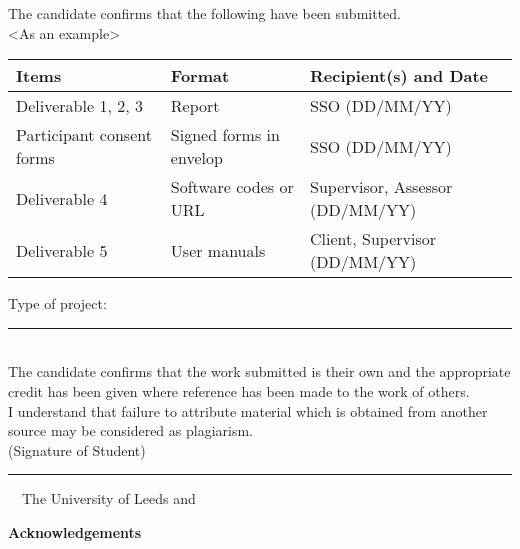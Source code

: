 \frontcover

\clearpage
\noindent The candidate confirms that the following have been submitted.\\
<As an example>
\begin{table}[ht!]
\begin{tabular}{|p{}|p{}|p{}|}
\hline 
Items & Format & Recipient(s) and Date \\ 
\hline 
Deliverable 1, 2, 3 & Report & SSO (DD/MM/YY) \\ 
\hline 
Participant consent forms & Signed forms in envelop & SSO (DD/MM/YY) \\ 
\hline 
Deliverable 4 & Software codes or URL & Supervisor, Assessor (DD/MM/YY) \\ 
\hline 
Deliverable 5 & User manuals & Client, Supervisor (DD/MM/YY) \\ 
\hline 
\end{tabular} 
\end{table}

\noindent Type of project: \rule{100mm}{1pt}
\vspace{\fill}\\
\noindent The candidate confirms that the work submitted is their own and the appropriate credit has been given where reference has been made to the work of others.
\vspace{\fill}\\
\noindent I understand that failure to attribute material which is obtained from another source may be considered as plagiarism.
\vspace{\fill}\\
\flushright(Signature of Student) \rule{50mm}{1pt}
\flushleft
\vspace{\fill}
\textcopyright~\session~The University of Leeds and~\fullname

\begin{dissertationsummary}

\end{dissertationsummary}

\clearpage
\centering\textbf{Acknowledgements}
\flushleft


\tableofcontents


